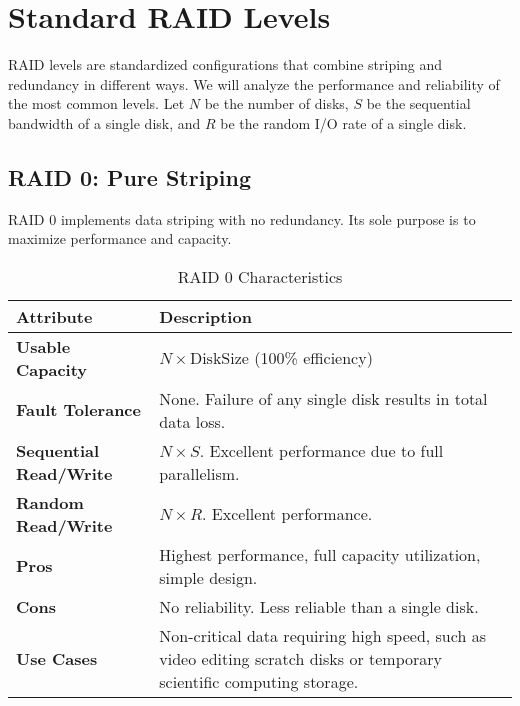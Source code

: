 \documentclass[12pt]{article}
\begin{document}
\newpage
\section{Standard RAID Levels}

RAID levels are standardized configurations that combine striping and redundancy in different ways. We will analyze the performance and reliability of the most common levels. Let $N$ be the number of disks, $S$ be the sequential bandwidth of a single disk, and $R$ be the random I/O rate of a single disk.

\subsection{RAID 0: Pure Striping}
RAID 0 implements data striping with no redundancy. Its sole purpose is to maximize performance and capacity.

\begin{table}[h!]
\centering
\caption{RAID 0 Characteristics}
\label{tab:raid0}
\begin{tabular}{>{\raggedright\arraybackslash}p{4cm} >{\raggedright\arraybackslash}p{8cm}}
\toprule
\textbf{Attribute} & \textbf{Description} \\
\midrule
\textbf{Usable Capacity} & $N \times \text{DiskSize}$ (100\% efficiency) \\
\textbf{Fault Tolerance} & None. Failure of any single disk results in total data loss. \\
\textbf{Sequential Read/Write} & $N \times S$. Excellent performance due to full parallelism. \\
\textbf{Random Read/Write} & $N \times R$. Excellent performance. \\
\textbf{Pros} & Highest performance, full capacity utilization, simple design. \\
\textbf{Cons} & No reliability. Less reliable than a single disk. \\
\textbf{Use Cases} & Non-critical data requiring high speed, such as video editing scratch disks or temporary scientific computing storage. \\
\bottomrule
\end{tabular}
\end{table}
\end{document}

